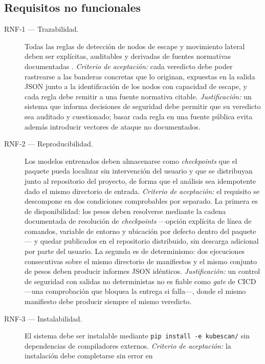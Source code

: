 \subsection{Requisitos no funcionales}

\begin{description}
  \item[RNF-1 — Trazabilidad.] Todas las reglas de detección de nodos de escape y
    movimiento lateral deben ser explícitas, auditables y derivadas de fuentes
    normativas documentadas \citep{NSA2022,BishopFox2021}.
    \textit{Criterio de aceptación:} cada veredicto debe poder rastrearse a las
    banderas concretas que lo originan, expuestas en la salida \acs{JSON} junto a
    la identificación de los nodos con capacidad de escape, y cada regla debe
    remitir a una fuente normativa citable.
    \textit{Justificación:} un sistema que informa decisiones de seguridad debe
    permitir que su veredicto sea auditado y cuestionado; basar cada regla en una
    fuente pública evita además introducir vectores de ataque no documentados.
  \item[RNF-2 — Reproducibilidad.] Los modelos entrenados deben almacenarse como
    \textit{checkpoints} que el paquete pueda localizar sin intervención del
    usuario y que se distribuyan junto al repositorio del proyecto, de forma que
    el análisis sea idempotente dado el mismo directorio de entrada.
    \textit{Criterio de aceptación:} el requisito se descompone en dos condiciones
    comprobables por separado. La primera es de disponibilidad: los pesos deben
    resolverse mediante la cadena documentada de resolución de \textit{checkpoints}
    —opción explícita de línea de comandos, variable de entorno y ubicación por
    defecto dentro del paquete— y quedar publicados en el repositorio distribuido,
    sin descarga adicional por parte del usuario. La segunda es de determinismo:
    dos ejecuciones consecutivas sobre el mismo directorio de manifiestos y el
    mismo conjunto de pesos deben producir informes \acs{JSON} idénticos.
    \textit{Justificación:} un control de seguridad con salidas no deterministas
    no es fiable como \textit{gate} de \acs{CICD} —una comprobación que bloquea la
    entrega si falla\mbox{—,} donde el mismo manifiesto debe
    producir siempre el mismo veredicto.
  \item[RNF-3 — Instalabilidad.] El sistema debe ser instalable mediante
    \texttt{pip install -e kubescan/} sin dependencias de compiladores externos.
    \textit{Criterio de aceptación:} la instalación debe completarse sin error en

\end{description}

